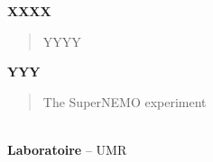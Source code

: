 
\centering \hrulefill
\begin{center}
  {\normalsize{\textbf{XXXX}}}
\end{center}


\begin{abstract}
  {\normalsize{

      YYYY


  }}
\end{abstract}


\begin{center}

  {\normalsize{\textbf{YYY}}}

\end{center}

\begin{abstract}

  {\normalsize{

      The SuperNEMO experiment



    }
  }
\end{abstract}

\begin{center}
  \hrulefill \\
  \textbf{Laboratoire} -- UMR  \\

\end{center}
